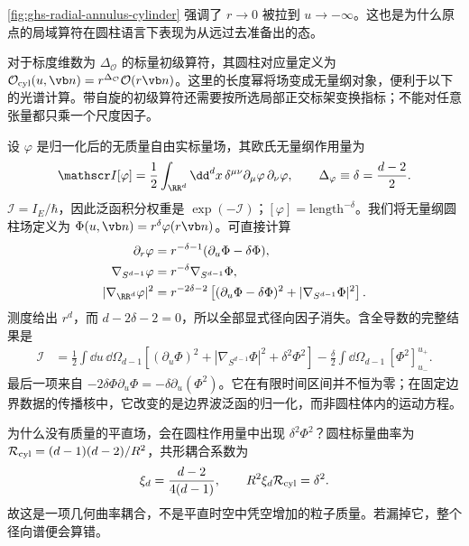 \cref{fig:ghs-radial-annulus-cylinder} 强调了 $r\to0$ 被拉到 $u\to-\infty$。这也是为什么原点的局域算符在圆柱语言下表现为从远过去准备出的态。

对于标度维数为 $\Delta_{\mathcal O}$ 的标量初级算符，其圆柱对应量定义为 $\mathcal O_{\rm cyl}(u,\vb n)=r^{\Delta_{\mathcal O}}\mathcal O(r\vb n)$。这里的长度幂将场变成无量纲对象，便利于以下的光谱计算。带自旋的初级算符还需要按所选局部正交标架变换指标；不能对任意张量都只乘一个尺度因子。


设 $\varphi$ 是归一化后的无质量自由实标量场，其欧氏无量纲作用量为
\begin{equation}\label{eq:ghs-flat-action}
 \mathscr I[\varphi]=\frac12\int_{\RR^d}\dd^d x\,\delta^{\mu\nu}
 \partial_\mu\varphi\,\partial_\nu\varphi,
 \qquad \Delta_\varphi\equiv\delta=\frac{d-2}{2}.
\end{equation}
$\mathscr I=I_E/\hbar$，因此泛函积分权重是 $\exp(-\mathscr I)$；$[\varphi]=\mathrm{length}^{-\delta}$。我们将无量纲圆柱场定义为 $\Phi(u,\vb n)=r^\delta\varphi(r\vb n)$。可直接计算
\begin{align*}
 \partial_r\varphi&=r^{-\delta-1}(\partial_u\Phi-\delta\Phi),\\
 \nabla_{S^{d-1}}\varphi&=r^{-\delta}\nabla_{S^{d-1}}\Phi,\\
 |\nabla_{\RR^d}\varphi|^2&=r^{-2\delta-2}
 \left[(\partial_u\Phi-\delta\Phi)^2+|\nabla_{S^{d-1}}\Phi|^2\right].
\end{align*}
测度给出 $r^d$，而 $d-2\delta-2=0$，所以全部显式径向因子消失。含全导数的完整结果是
\begin{align}\label{eq:ghs-cylinder-action}
 \mathscr I&=\frac12\int\dd u\,\dd\Omega_{d-1}
 \left[(\partial_u\Phi)^2+|\nabla_{S^{d-1}}\Phi|^2+\delta^2\Phi^2\right]
 -\frac\delta2\int\dd\Omega_{d-1}\,[\Phi^2]_{u_-}^{u_+}.
\end{align}
最后一项来自 $-2\delta\Phi\partial_u\Phi=-\delta\partial_u(\Phi^2)$。它在有限时间区间并不恒为零；在固定边界数据的传播核中，它改变的是边界波泛函的归一化，而非圆柱体内的运动方程。

为什么没有质量的平直场，会在圆柱作用量中出现 $\delta^2\Phi^2$？圆柱标量曲率为 $\mathcal R_{\rm cyl}=(d-1)(d-2)/R^2$，共形耦合系数为
\begin{equation}\label{eq:ghs-conformal-coupling}
 \xi_d=\frac{d-2}{4(d-1)},\qquad
 R^2\xi_d\mathcal R_{\rm cyl}=\delta^2.
\end{equation}
故这是一项几何曲率耦合，不是平直时空中凭空增加的粒子质量。若漏掉它，整个径向谱便会算错。


